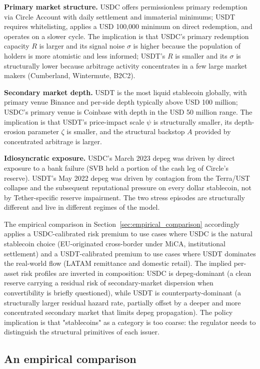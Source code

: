 \textbf{Primary market structure.} USDC offers permissionless primary redemption via Circle Account with daily settlement and immaterial minimums; USDT requires whitelisting, applies a USD 100,000 minimum on direct redemption, and operates on a slower cycle. The implication is that USDC's primary redemption capacity $R$ is larger and its signal noise $\sigma$ is higher because the population of holders is more atomistic and less informed; USDT's $R$ is smaller and its $\sigma$ is structurally lower because arbitrage activity concentrates in a few large market makers (Cumberland, Wintermute, B2C2).

\textbf{Secondary market depth.} USDT is the most liquid stablecoin globally, with primary venue Binance and per-side depth typically above USD 100 million; USDC's primary venue is Coinbase with depth in the USD 50 million range. The implication is that USDT's price-impact scale $\psi$ is structurally smaller, its depth-erosion parameter $\zeta$ is smaller, and the structural backstop $A$ provided by concentrated arbitrage is larger.

\textbf{Idiosyncratic exposure.} USDC's March 2023 depeg was driven by direct exposure to a bank failure (SVB held a portion of the cash leg of Circle's reserve). USDT's May 2022 depeg was driven by contagion from the Terra/UST collapse and the subsequent reputational pressure on every dollar stablecoin, not by Tether-specific reserve impairment. The two stress episodes are structurally different and live in different regimes of the model.

The empirical comparison in Section~\ref{sec:empirical_comparison} accordingly applies a USDC-calibrated risk premium to use cases where USDC is the natural stablecoin choice (EU-originated cross-border under MiCA, institutional settlement) and a USDT-calibrated premium to use cases where USDT dominates the real-world flow (LATAM remittance and domestic retail). The implied per-asset risk profiles are inverted in composition: USDC is depeg-dominant (a clean reserve carrying a residual risk of secondary-market dispersion when convertibility is briefly questioned), while USDT is counterparty-dominant (a structurally larger residual hazard rate, partially offset by a deeper and more concentrated secondary market that limits depeg propagation). The policy implication is that "stablecoins" as a category is too coarse: the regulator needs to distinguish the structural primitives of each issuer.

\subsection{An empirical comparison}\label{sub:what_it_delivers}

